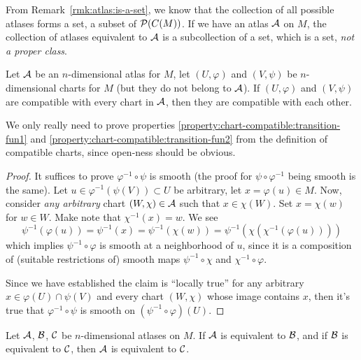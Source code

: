 \begin{remark}\label{rmk:atlas:equivalence-class-is-proper-set}
From Remark~\ref{rmk:atlas:is-a-set}, we know that the collection of all
possible atlases forms a set, a subset of $\mathcal{P}(C(M))$.
If we have an atlas $\mathcal{A}$ on $M$, the collection of atlases
equivalent to $\mathcal{A}$ is a subcollection of a set, which is a set,
\emph{not a proper class}.
\end{remark}

\begin{lemma}
Let $\mathcal{A}$ be an $n$-dimensional atlas for $M$, let $(U,\varphi)$ and $(V,\psi)$ 
be $n$-dimensional charts for $M$ (but they do not belong to $\mathcal{A}$).
If $(U,\varphi)$ and $(V,\psi)$ are compatible with every chart in $\mathcal{A}$,
then they are compatible with each other.
\end{lemma}

We only really need to prove properties
\ref{property:chart-compatible:transition-fun1} and
\ref{property:chart-compatible:transition-fun2} from the definition of
compatible charts, since open-ness should be obvious.

\begin{proof}
It suffices to prove $\varphi^{-1}\circ\psi$ is smooth (the proof for
$\psi\circ\varphi^{-1}$ being smooth is the same).
Let $u\in\varphi^{-1}(\psi(V))\subset U$ be arbitrary,
let $x=\varphi(u)\in M$.
Now, consider \emph{any arbitrary} chart $(W,\chi)\in\mathcal{A}$ such that $x\in\chi(W)$.
Set $x=\chi(w)$ for $w\in W$. Make note that $\chi^{-1}(x)=w$. We see
\begin{equation}
\psi^{-1}(\varphi(u)) = \psi^{-1}(x) = \psi^{-1}(\chi(w))=\psi^{-1}(\chi(\chi^{-1}(\varphi(u))))
\end{equation}
which implies $\psi^{-1}\circ\varphi$ is smooth at a neighborhood of $u$,
since it is a composition of (suitable restrictions of) smooth maps
$\psi^{-1}\circ\chi$ and $\chi^{-1}\circ\varphi$.

Since we have established the claim is ``locally true'' for any
arbitrary $x\in\varphi(U)\cap\psi(V)$ and every chart $(W,\chi)$ whose
image contains $x$, then it's true that $\varphi^{-1}\circ\psi$ is
smooth on $(\psi^{-1}\circ\varphi)(U)$.
\end{proof}

\begin{corollary}
Let $\mathcal{A}$, $\mathcal{B}$, $\mathcal{C}$ be $n$-dimensional
atlases on $M$. If $\mathcal{A}$ is equivalent to $\mathcal{B}$, and if
$\mathcal{B}$ is equivalent to $\mathcal{C}$, then $\mathcal{A}$ is
equivalent to $\mathcal{C}$.
\end{corollary}

